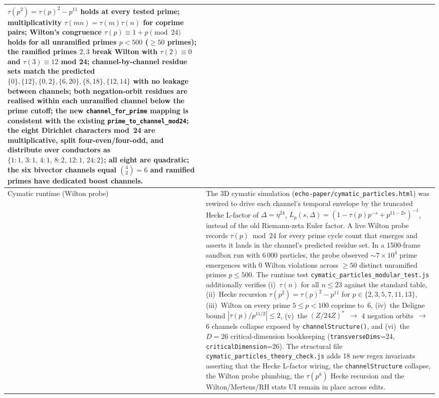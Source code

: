 \documentclass[11pt,a4paper]{article}
\theoremstyle{plain}
\theoremstyle{definition}
\theoremstyle{remark}
\numberwithin{equation}{section}
\begin{document}
\begin{longtable}{>{\raggedright\arraybackslash}p{3.1cm}>{\raggedright\arraybackslash}p{9.1cm}}
\(\tau(p^2)=\tau(p)^2-p^{11}\) holds at every tested prime;
multiplicativity \(\tau(mn)=\tau(m)\tau(n)\) for coprime pairs;
Wilton's congruence \(\tau(p)\equiv1+p\pmod{24}\) holds for all
unramified primes \(p<500\) (\(\ge 50\) primes); the ramified primes
\(2,3\) break Wilton with \(\tau(2)\equiv0\) and \(\tau(3)\equiv12\)
mod 24; channel-by-channel residue sets match the predicted
\(\{0\},\{12\},\{0,2\},\{6,20\},\{8,18\},\{12,14\}\) with no leakage
between channels; both negation-orbit residues are realised within
each unramified channel below the prime cutoff; the new
\texttt{channel\_for\_prime} mapping is consistent with the existing
\texttt{prime\_to\_channel\_mod24}; the eight Dirichlet characters
mod~24 are multiplicative, split four-even/four-odd, and distribute
over conductors as \(\{1{:}1,\,3{:}1,\,4{:}1,\,8{:}2,\,12{:}1,\,
24{:}2\}\); all eight are quadratic; the six bivector channels equal
\(\binom{4}{2}=6\) and ramified primes have dedicated boost channels. \\
\midrule
Cymatic runtime (Wilton probe) &
The 3D cymatic simulation
(\texttt{echo-paper/cymatic\_particles.html}) was rewired to drive
each channel's temporal envelope by the truncated Hecke L-factor of
\(\Delta=\eta^{24}\),
\(L_p(s,\Delta)=(1-\tau(p)p^{-s}+p^{11-2s})^{-1}\), instead of the
old Riemann-zeta Euler factor.  A live Wilton probe records
\(\tau(p)\bmod24\) for every prime cycle count that emerges and
asserts it lands in the channel's predicted residue set.  In a
1500-frame sandbox run with 6\,000 particles, the probe observed
\(\sim7\times10^{4}\) prime emergences with \(0\) Wilton violations
across \(\ge 50\) distinct unramified primes \(p\le 500\).  The
runtime test \texttt{cymatic\_particles\_modular\_test.js} additionally
verifies (i)~\(\tau(n)\) for all \(n\le 23\) against the standard
table, (ii)~Hecke recursion \(\tau(p^{2})=\tau(p)^{2}-p^{11}\) for
\(p\in\{2,3,5,7,11,13\}\), (iii)~Wilton on every prime
\(5\le p<100\) coprime to~\(6\), (iv)~the Deligne bound
\(|\tau(p)/p^{11/2}|\le2\), (v)~the
\((Z/24Z)^{\!*}\)~\(\to\) 4 negation orbits~\(\to\) 6 channels collapse
exposed by \texttt{channelStructure()}, and (vi)~the \(D=26\)
critical-dimension bookkeeping (\texttt{transverseDims}=24,
\texttt{criticalDimension}=26).  The structural file
\texttt{cymatic\_particles\_theory\_check.js} adds 18 new regex
invariants asserting that the Hecke L-factor wiring, the
\texttt{channelStructure} collapse, the Wilton probe plumbing, the
\(\tau(p^k)\) Hecke recursion and the Wilton/Mertens/RH stats UI
remain in place across edits. \\
\bottomrule
\end{longtable}
\endgroup
\end{document}
